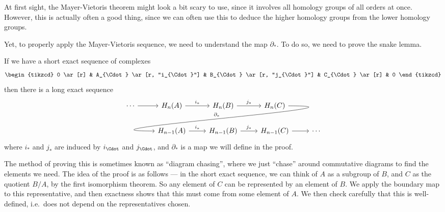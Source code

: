 \documentclass[a4paper]{article}
\begin{document}
At first sight, the Mayer-Vietoris theorem might look a bit scary to use, since it involves all homology groups of all orders at once. However, this is actually often a good thing, since we can often use this to deduce the higher homology groups from the lower homology groups.

Yet, to properly apply the Mayer-Vietoris sequence, we need to understand the map $\partial_*$. To do so, we need to prove the snake lemma.
\begin{thm}
  If we have a short exact sequence of complexes
  \[
    \begin{tikzcd}
      0 \ar[r] & A_{\Cdot} \ar [r, "i_{\Cdot}"] & B_{\Cdot} \ar [r, "j_{\Cdot}"] & C_{\Cdot} \ar[r] & 0
    \end{tikzcd}
  \]
  then there is a long exact sequence
  \[
    \begin{tikzcd}
      \cdots \ar [r] & H_n(A) \ar[r, "i_*"] & H_n(B) \ar[r, "j_*"] & H_n(C) \ar[out=0, in=180, looseness=2, overlay, dll, "\partial_*"']\\
      & H_{n - 1}(A) \ar[r, "i_*"] & H_{n - 1}(B) \ar[r, "j_*"] & H_{n - 1}(C) \ar [r] & \cdots
    \end{tikzcd}
  \]
  where $i_*$ and $j_*$ are induced by $i_{\Cdot}$ and $j_{\Cdot}$, and $\partial_*$ is a map we will define in the proof.
\end{thm}
The method of proving this is sometimes known as ``diagram chasing'', where we just ``chase'' around commutative diagrams to find the elements we need. The idea of the proof is as follows --- in the short exact sequence, we can think of $A$ as a subgroup of $B$, and $C$ as the quotient $B/A$, by the first isomorphism theorem. So any element of $C$ can be represented by an element of $B$. We apply the boundary map to this representative, and then exactness shows that this must come from some element of $A$. We then check carefully that this is well-defined, i.e.\ does not depend on the representatives chosen.
\end{document}
